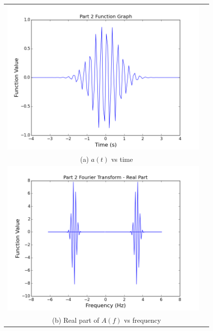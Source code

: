 \documentclass[11pt]{article}
\begin{document}
\begin{figure}[ht]
\centering
\begin{tabular}{cc}
\includegraphics[scale=.4]{prt2_function.png} \\
\multicolumn{2}{c}{(a) $a(t)$ vs time} \\[6pt]

\includegraphics[scale=.4]{prt2_fourReal.png}\\
\multicolumn{2}{c}{(b) Real part of $A(f)$ vs frequency} \\[6pt]


\end{tabular}
\end{figure}
\end{document}
